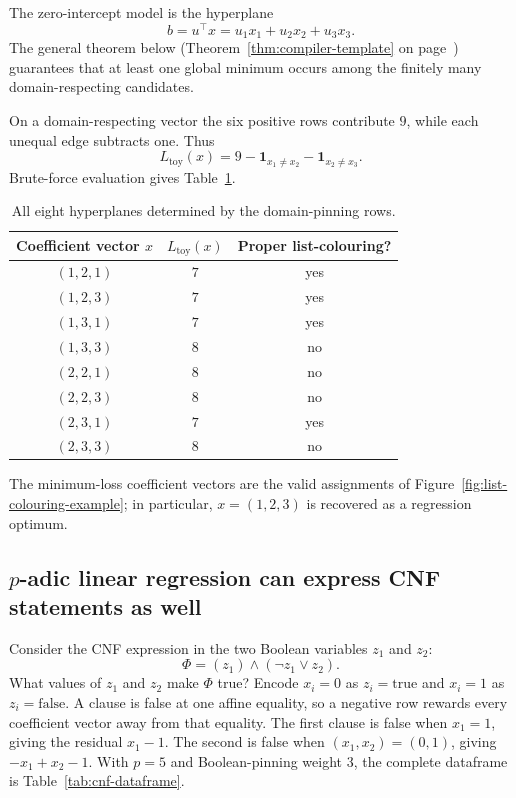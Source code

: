 \documentclass[11pt]{article}
\begin{document}
The zero-intercept model is the hyperplane
\[
b=u^\top x=u_1x_1+u_2x_2+u_3x_3.
\]
The general theorem below (Theorem~\ref{thm:compiler-template} on page~\pageref{thm:compiler-template}) guarantees that at least one global minimum occurs among the finitely many domain-respecting candidates.

On a domain-respecting vector the six positive rows contribute \(9\), while each unequal edge subtracts one. Thus
\[
L_{\mathrm{toy}}(x)=9-\mathbf 1_{x_1\ne x_2}-\mathbf 1_{x_2\ne x_3}.
\]
Brute-force evaluation gives Table~\ref{tab:list-colouring-candidates}.



\begin{table}[t]
\centering
\small
\begin{tabular}{@{}ccc@{}}
\toprule
Coefficient vector $x$ & $L_{\mathrm{toy}}(x)$ & Proper list-colouring? \\
\midrule
$(1,2,1)$ & $7$ & yes \\
$(1,2,3)$ & $7$ & yes \\
$(1,3,1)$ & $7$ & yes \\
$(1,3,3)$ & $8$ & no \\
$(2,2,1)$ & $8$ & no \\
$(2,2,3)$ & $8$ & no \\
$(2,3,1)$ & $7$ & yes \\
$(2,3,3)$ & $8$ & no \\
\bottomrule
\end{tabular}
\caption{All eight hyperplanes determined by the domain-pinning rows.}
\label{tab:list-colouring-candidates}
\end{table}

The minimum-loss coefficient vectors are the valid assignments of Figure~\ref{fig:list-colouring-example}; in particular, \(x=(1,2,3)\) is recovered as a regression optimum.

\subsection{\texorpdfstring{\(p\)-adic}{p-adic} linear regression can express CNF statements as well}
\label{sec:worked-cnf}

Consider the CNF expression in the two Boolean variables \(z_1\) and \(z_2\):
\[
\Phi=(z_1)\wedge(\neg z_1\vee z_2).
\]
What values of \(z_1\) and \(z_2\) make \(\Phi\) true? Encode \(x_i=0\) as \(z_i=\mathrm{true}\) and \(x_i=1\) as \(z_i=\mathrm{false}\). A clause is false at one affine equality, so a negative row rewards every coefficient vector away from that equality. The first clause is false when \(x_1=1\), giving the residual \(x_1-1\). The second is false when \((x_1,x_2)=(0,1)\), giving \(-x_1+x_2-1\). With \(p=5\) and Boolean-pinning weight \(3\), the complete dataframe is Table~\ref{tab:cnf-dataframe}.
\end{document}
